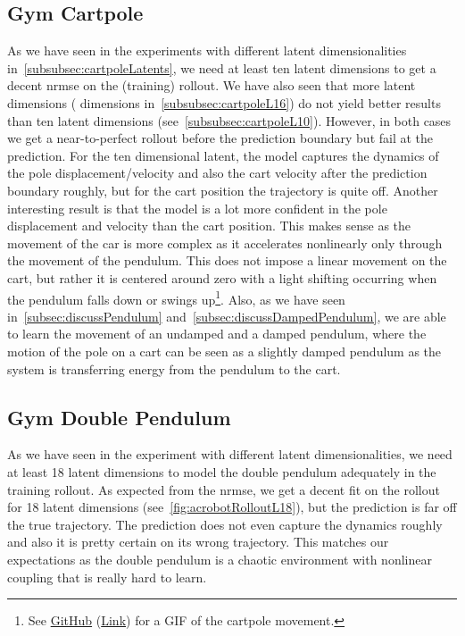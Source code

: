 	\subsection{Gym Cartpole}
		As we have seen in the experiments with different latent dimensionalities in~\autoref{subsubsec:cartpoleLatents}, we need at least ten latent dimensions to get a decent \ac{nrmse} on the (training) rollout. We have also seen that more latent dimensions ( dimensions in~\autoref{subsubsec:cartpoleL16}) do not yield better results than ten latent dimensions (see~\autoref{subsubsec:cartpoleL10}). However, in both cases we get a near-to-perfect rollout before the prediction boundary but fail at the prediction. For the ten dimensional latent, the model captures the dynamics of the pole displacement/velocity and also the cart velocity after the prediction boundary roughly, but for the cart position the trajectory is quite off. Another interesting result is that the model is a lot more confident in the pole displacement and velocity than the cart position. This makes sense as the movement of the car is more complex as it accelerates nonlinearly only through the movement of the pendulum. This does not impose a linear movement on the cart, but rather it is centered around zero with a light shifting occurring when the pendulum falls down or swings up\footnote{See \href{https://raw.githubusercontent.com/fdamken/bachelors-thesis/b5a4acbc1d10fa0224a73201995222690d2fb6de/thesis/figures/cartpole.gif}{GitHub} (\href{https://raw.githubusercontent.com/fdamken/bachelors-thesis/b5a4acbc1d10fa0224a73201995222690d2fb6de/thesis/figures/cartpole.gif}{Link}) for a GIF of the cartpole movement.}. Also, as we have seen in~\autoref{subsec:discussPendulum} and~\autoref{subsec:discussDampedPendulum}, we are able to learn the movement of an undamped and a damped pendulum, where the motion of the pole on a cart can be seen as a slightly damped pendulum as the system is transferring energy from the pendulum to the cart.

	\subsection{Gym Double Pendulum}
		As we have seen in the experiment with different latent dimensionalities, we need at least 18 latent dimensions to model the double pendulum adequately in the training rollout. As expected from the \ac{nrmse}, we get a decent fit on the rollout for 18 latent dimensions (see~\autoref{fig:acrobotRolloutL18}), but the prediction is far off the true trajectory. The prediction does not even capture the dynamics roughly and also it is pretty certain on its wrong trajectory. This matches our expectations as the double pendulum is a chaotic environment with nonlinear coupling that is really hard to learn.

